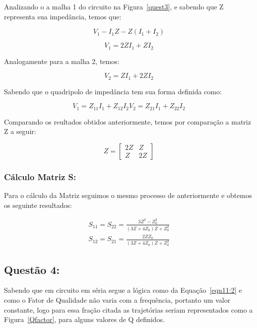 \documentclass[a4paper,12pt]{proc}
\begin{document}
Analizando o a malha 1 do circuito na Figura~\ref{quest3}, e sabendo que Z representa sua impedância, temos que:

\[V_{1} - I_{1}Z - Z(I_{1} + I_{2})\]

\[V_{1} = 2ZI_{1} + ZI_{2}\]

\noindent Analogamente para a malha 2, temos:

\[V_{2} = ZI_{1} + 2ZI_{2}\]

\noindent Sabendo que o quadripolo de impedância tem sua forma definida como:

\begin{subequations}
    \label{eqn9}
    \begin{equation}
        \label{eqn9:1}
        V_{1} = Z_{11}I_{1} + Z_{12}I_{2}
    \end{equation}

    \begin{equation}
        \label{eqn9:2}
        V_{2} = Z_{21}I_{1} + Z_{22}I_{2}
    \end{equation}
\end{subequations}


\noindent Comparando os reultados obtidos anteriormente, temos por comparação a matriz Z a seguir:

\[ Z= \begin{bmatrix} 2Z & Z\\ Z & 2Z \end{bmatrix}\]

\subsubsection{Cálculo Matriz S:}

Para o cálculo da Matriz seguimos o mesmo processo de anteriormente e obtemos os seguinte resultados:

\begin{align*}
    S_{11} = S_{22} = \frac{3Z^{2}-Z_{0}^{2}}{(3Z+4Z_{0})Z + Z_{0}^{2}}\\
    S_{12} = S_{21} = \frac{2ZZ_{0}}{(3Z+4Z_{0})Z + Z_{0}^{2}}
\end{align*}

\subsection{Questão 4:}

Sabendo que em circuito em séria segue a lógica como da Equação~\ref{eqn11:2} e como o Fator de Qualidade não varia com a frequência, portanto um valor constante, logo para essa fração citada as trajetórias seriam representados como a Figura~\ref{Qfactor}, para alguns valores de Q definidos.
\end{document}
